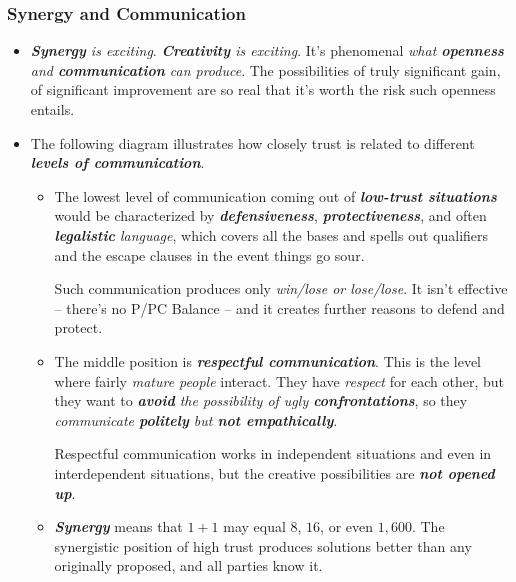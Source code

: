 \documentclass[11pt]{article}
\begin{document}
\subsubsection{Synergy and Communication}
\begin{itemize}
\item \emph{\textbf{Synergy} is exciting}. \emph{\textbf{Creativity} is exciting}. It's phenomenal \emph{what \textbf{openness} and \textbf{communication} can produce}. The possibilities of truly significant gain, of significant improvement are so real that it's worth the risk such openness entails.

\item The following diagram illustrates how closely trust is related to different \emph{\textbf{levels of communication}}.
 \begin{itemize}
\item The lowest level of communication coming out of \emph{\textbf{low-trust situations}} would be characterized by \emph{\textbf{defensiveness}}, \emph{\textbf{protectiveness}}, and often \emph{\textbf{legalistic} language}, which covers all the bases and spells out qualifiers and the escape clauses in the event things go sour. 

Such communication produces only \emph{win/lose or lose/lose}. It isn't effective -- there's no P/PC Balance -- and it creates further reasons to defend and protect.

\item The middle position is \emph{\textbf{respectful communication}}. This is the level where fairly \emph{mature people} interact. They have \emph{respect} for each other, but they want to \emph{\textbf{avoid} the possibility of ugly \textbf{confrontations}}, so they \emph{communicate \textbf{politely} but \textbf{not empathically}}. 

Respectful communication works in independent situations and even in interdependent situations, but the creative possibilities are \emph{\textbf{not opened up}}. 

\item \emph{\textbf{Synergy}} means that $1 + 1$ may equal $8$, $16$, or even $1,600$. The synergistic position of high trust produces solutions better than any originally proposed, and all parties know it.
\end{itemize}
\end{itemize}
\end{document}
